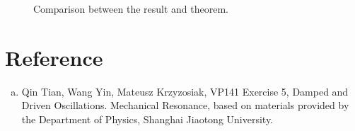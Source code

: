 \documentclass{article}
\begin{document}
\begin{figure}[h!]
	\centering
	\caption{Comparison between the result and theorem.}
	\label{fig-7}
\end{figure}

\section{Reference}

\begin{enumerate}[(a)]
	\item
	Qin Tian, Wang Yin, Mateusz Krzyzosiak, VP141 Exercise 5, Damped and Driven Oscillations. Mechanical Resonance, based on materials provided by the Department of Physics, Shanghai Jiaotong University.
\end{enumerate}
\end{document}
